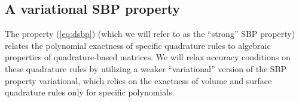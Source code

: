 \documentclass{svjour3}                     %
\begin{document}
%


\subsection{A variational SBP property}


The property (\ref{eq:dsbp}) (which we will refer to as the ``strong'' SBP property) relates the polynomial exactness of specific quadrature rules to algebraic properties of quadrature-based matrices.  We will relax accuracy conditions on these quadrature rules by utilizing a weaker ``variational'' version of the SBP property variational, which relies on the exactness of volume and surface quadrature rules only for specific polynomials.  
\end{document}
